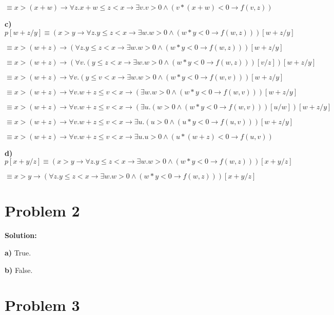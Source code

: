 \documentclass{article}
\begin{document}
\qquad \qquad \qquad  $ \equiv x>(x+w) \rightarrow \forall z.x+w \leq z < x \rightarrow \exists v.v>0 \wedge (v*(x+w)<0 \rightarrow f(v,z))$

\vspace{10pt}
\textbf{c)} $ p[w+z/y] \equiv (x>y \rightarrow \forall z.y \leq z < x \rightarrow \exists w.w>0 \wedge (w*y<0 \rightarrow f(w,z)))[w+z/y]$

\qquad \qquad \qquad  $ \equiv x>(w+z) \rightarrow (\forall z.y \leq z < x \rightarrow \exists w.w>0 \wedge (w*y<0 \rightarrow f(w,z)))[w+z/y]$

\qquad \qquad \qquad  $ \equiv x>(w+z) \rightarrow (\forall v.(y \leq z < x \rightarrow \exists w.w>0 \wedge (w*y<0 \rightarrow f(w,z)))[v/z])[w+z/y]$

\qquad \qquad \qquad  $ \equiv x>(w+z) \rightarrow \forall v.(y \leq v < x \rightarrow \exists w.w>0 \wedge (w*y<0 \rightarrow f(w,v)))[w+z/y]$

\qquad \qquad \qquad  $ \equiv x>(w+z) \rightarrow \forall v.w+z \leq v < x \rightarrow (\exists w.w>0 \wedge (w*y<0 \rightarrow f(w,v)))[w+z/y]$

\qquad \qquad \qquad  $ \equiv x>(w+z) \rightarrow \forall v.w+z \leq v < x \rightarrow (\exists u.(w>0 \wedge (w*y<0 \rightarrow f(w,v)))[u/w])[w+z/y]$

\qquad \qquad \qquad  $ \equiv x>(w+z) \rightarrow \forall v.w+z \leq v < x \rightarrow \exists u.(u>0 \wedge (u*y<0 \rightarrow f(u,v)))[w+z/y]$

\qquad \qquad \qquad  $ \equiv x>(w+z) \rightarrow \forall v.w+z \leq v < x \rightarrow \exists u.u>0 \wedge (u*(w+z)<0 \rightarrow f(u,v))$

\vspace{10pt}
\textbf{d)} $ p[x+y/z] \equiv (x>y \rightarrow \forall z.y \leq z < x \rightarrow \exists w.w>0 \wedge (w*y<0 \rightarrow f(w,z)))[x+y/z]$

\qquad \qquad \qquad  $ \equiv x>y \rightarrow (\forall z.y \leq z < x \rightarrow \exists w.w>0 \wedge (w*y<0 \rightarrow f(w,z)))[x+y/z]$


\section*{Problem 2}

\textbf{Solution: } 

\textbf{a)} True.

\textbf{b)} False.


\section*{Problem 3}
\end{document}
